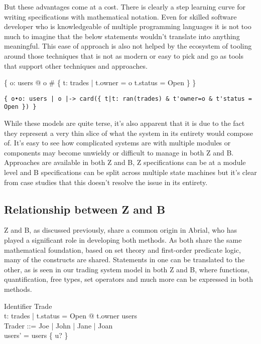 \documentclass{article}
\begin{document}
\pagebreak

\hspace{-0.60cm} But these advantages come at a cost. There is clearly a step learning curve for writing specifications with mathematical notation. Even for skilled software developer who is knowledgeable of multiple programming languages it is not too much to imagine that the below statements wouldn’t translate into anything meaningful. This ease of approach is also not helped by the ecosystem of tooling around those techniques that is not as modern or easy to pick and go as tools that support other techniques and approaches. 

\begin{zed}
\{ o: users @ o \mapsto \# \{ t: \ran trades | t.owner = o \land t.status = Open \} \}
\end{zed}

\begin{verbatim}
{ o•o: users | o |-> card({ t|t: ran(trades) & t'owner=o & t'status = Open }) }
\end{verbatim}

While these models are quite terse, it’s also apparent that it is due to the fact they represent a very thin slice of what the system in its entirety would compose of. It’s easy to see how complicated systems are with multiple modules or components may become unwieldy or difficult to manage in both Z and B. Approaches are available in both Z and B, Z specifications can be at a module level and B specifications can be split across multiple state machines but it’s clear from case studies that this doesn’t resolve the issue in its entirety.

\pagebreak
\subsection*{Relationship between Z and B}

Z and B, as discussed previously, share a common origin in Abrial, who has played a significant role in developing both methods. As both share the same mathematical foundation, based on set theory and first-order predicate logic, many of the constructs are shared. Statements in one can be translated to the other, as is seen in our trading system model in both Z and B, where functions, quantification, free types, set operators and much more can be expressed in both methods. 
\begin{zed}
Identifier \pfun Trade \\
\forall t: \ran trades | t.status = Open @ t.owner \in users \\
Trader ::= Joe | John | Jane | Joan  \\
users' = users \setminus \{ u? \} \\
\end{zed}
\end{document}
